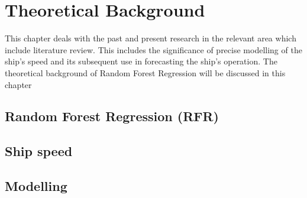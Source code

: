 \section{Theoretical Background} \label{theory}

This chapter deals with the past and present research in the relevant area which include literature review. This includes 
the significance of precise modelling of the ship's speed and its subsequent use in forecasting the ship's operation.
The theoretical background of Random Forest Regression will be discussed in this chapter 

\subsection{Random Forest Regression (RFR)}


\subsection{Ship speed}


\subsection{Modelling}




